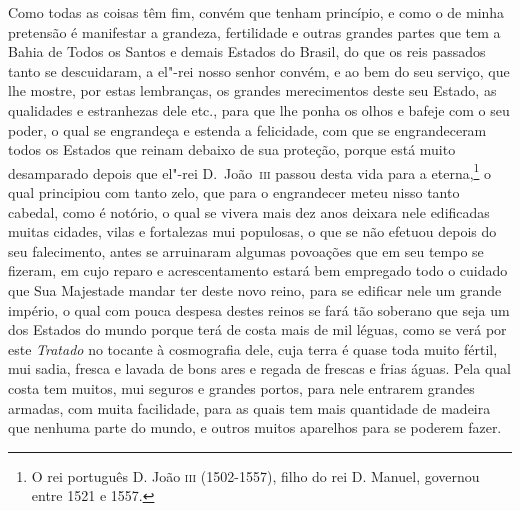 Como todas as coisas têm fim, convém que tenham princípio, e como o de minha pretensão é
manifestar a grandeza, fertilidade e outras grandes partes que tem a Bahia de Todos os
Santos e demais Estados do Brasil, do que os reis passados tanto se descuidaram, a el"-rei
nosso senhor convém, e ao bem do seu serviço, que lhe mostre, por estas lembranças, os
grandes merecimentos deste seu Estado, as qualidades e estranhezas dele etc., para que lhe
ponha os olhos e bafeje com o seu poder, o qual se engrandeça e estenda a felicidade, com
que se engrandeceram todos os Estados que reinam debaixo de sua proteção, porque está
muito desamparado depois que el"-rei D.~João~\textsc{iii} passou desta vida para a
eterna,\footnote{ O rei português D. João \textsc{iii} (1502-1557), filho do rei
D. Manuel, governou entre 1521 e 1557.} o qual principiou com tanto zelo, que para o
engrandecer meteu nisso tanto cabedal, como é notório, o qual se vivera mais dez anos
deixara nele edificadas muitas cidades, vilas e fortalezas mui populosas, o que se não
efetuou depois do seu falecimento, antes se arruinaram algumas povoações que em seu tempo
se fizeram, em cujo reparo e acrescentamento estará bem empregado todo o cuidado que Sua
Majestade mandar ter deste novo reino, para se edificar nele um grande império, o
qual com pouca despesa destes reinos se fará tão soberano que seja um dos Estados do mundo
porque terá de costa mais de mil léguas, como se verá por este \textit{Tratado} no tocante
à cosmografia dele, cuja terra é quase toda muito fértil, mui sadia, fresca e lavada de
bons ares e regada de frescas e frias águas. Pela qual costa tem muitos, mui seguros e
grandes portos, para nele entrarem grandes armadas, com muita facilidade, para as quais
tem mais quantidade de madeira que nenhuma parte do mundo, e outros muitos aparelhos para
se poderem fazer.

